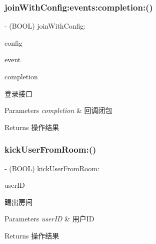 \subsubsection{\texorpdfstring{join\+With\+Config\+:events\+:completion\+:()}{joinWithConfig:events:completion:()}}
{\footnotesize\ttfamily -\/ (B\+O\+OL) join\+With\+Config\+: \begin{DoxyParamCaption}\item[{(\hyperlink{interface_c_c_encode_config}{C\+C\+Encode\+Config} $\ast$)}]{config }\item[{events:(N\+S\+Array $\ast$)}]{event }\item[{completion:(C\+C\+Comletion\+Block)}]{completion }\end{DoxyParamCaption}}

登录接口 
\begin{DoxyParams}{Parameters}
{\em completion} & 回调闭包 \\
\hline
\end{DoxyParams}
\begin{DoxyReturn}{Returns}
操作结果 
\end{DoxyReturn}
\mbox{\label{interface_c_c_streamer_basic_ab32594777e441a8edf1f93b1135d9204}} 
\subsubsection{\texorpdfstring{kick\+User\+From\+Room\+:()}{kickUserFromRoom:()}}
{\footnotesize\ttfamily -\/ (B\+O\+OL) kick\+User\+From\+Room\+: \begin{DoxyParamCaption}\item[{(N\+S\+String $\ast$)}]{user\+ID }\end{DoxyParamCaption}}

踢出房间 
\begin{DoxyParams}{Parameters}
{\em user\+ID} & 用户\+ID\\
\hline
\end{DoxyParams}
\begin{DoxyReturn}{Returns}
操作结果 
\end{DoxyReturn}
\mbox{\label{interface_c_c_streamer_basic_ab78edee32e3ccd7b1e6d8a46b517dc38}} 
